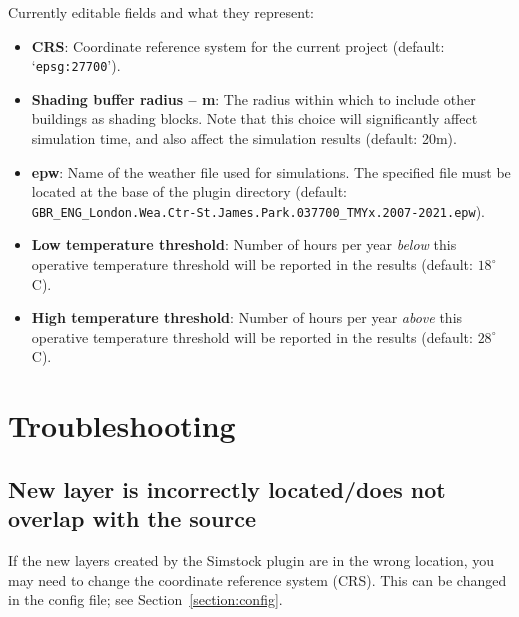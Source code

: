\documentclass{article}
\begin{document}
Currently editable fields and what they represent:
\begin{itemize}
    \item \textbf{CRS}: Coordinate reference system for the current project (default: `\texttt{epsg:27700}').
    \item \textbf{Shading buffer radius -- m}: The radius within which to include other buildings as shading blocks. Note that this choice will significantly affect simulation time, and also affect the simulation results (default: 20m).
    \item \textbf{epw}: Name of the weather file used for simulations. The specified file must be located at the base of the plugin directory (default: \texttt{GBR\_ENG\_London.Wea.Ctr-St.James.Park.037700\_TMYx.2007-2021.epw}).
    \item \textbf{Low temperature threshold}: Number of hours per year \textit{below} this operative temperature threshold will be reported in the results (default: $18^{\circ}$C).
    \item \textbf{High temperature threshold}: Number of hours per year \textit{above} this operative temperature threshold will be reported in the results (default: $28^{\circ}$C).
\end{itemize}

\clearpage
\section{Troubleshooting}
\subsection{New layer is incorrectly located/does not overlap with the source}
If the new layers created by the Simstock plugin are in the wrong location, you may need to change the coordinate reference system (CRS). This can be changed in the config file; see Section~\ref{section:config}.
\end{document}
